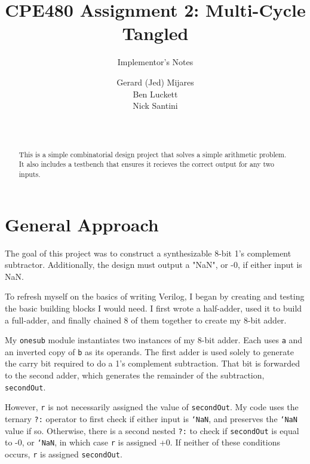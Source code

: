 \documentclass{sig-alternate-05-2015}
\begin{document}

\title{CPE480 Assignment 2: Multi-Cycle Tangled }
\subtitle{Implementor's Notes}

\author{
Gerard (Jed) Mijares\\
Ben Luckett\\
Nick Santini\\
       \\
       \\
}


\maketitle
\begin{abstract}
This is a simple combinatorial design project that solves a simple arithmetic problem. It also includes a testbench that ensures it recieves the correct output for any two inputs.
\end{abstract}


\section{General Approach}

The goal of this project was to construct a synthesizable 8-bit 1's complement subtractor. Additionally, the design must output a "NaN", or -0, if either input is NaN.

To refresh myself on the basics of writing Verilog, I began by creating and testing the basic building blocks I would need. I first wrote a half-adder, used it to build a full-adder, and finally chained 8 of them together to create my 8-bit adder.

My \texttt{onesub} module instantiates two instances of my 8-bit adder. Each uses \texttt{a} and an inverted copy of \texttt{b} as its operands. The first adder is used solely to generate the carry bit required to do a 1's complement subtraction. That bit is forwarded to the second adder, which generates the remainder of the subtraction, \texttt{secondOut}.

However, \texttt{r} is not necessarily assigned the value of \texttt{secondOut}. My code uses the ternary \texttt{?:} operator to first check if either input is \texttt{`NaN}, and preserves the \texttt{`NaN} value if so. Otherwise, there is a second nested \texttt{?:} to check if \texttt{secondOut} is equal to -0, or \texttt{`NaN}, in which case \texttt{r} is assigned +0. If neither of these conditions occurs, \texttt{r} is assigned \texttt{secondOut}.
\end{document}
